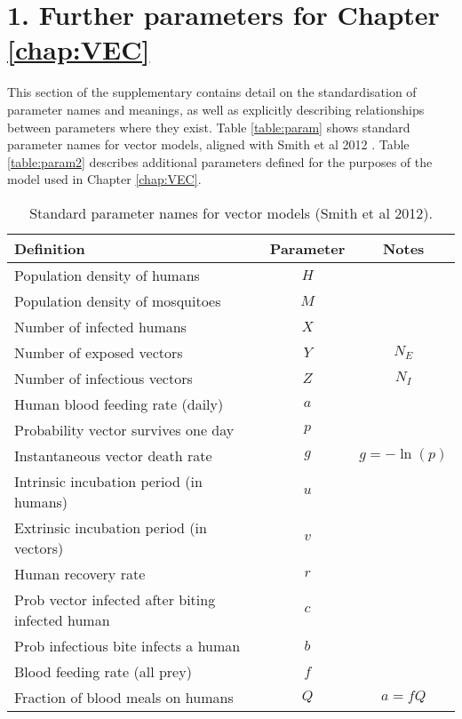 \section*{1. Further parameters for Chapter \ref{chap:VEC}}

This section of the supplementary contains detail on the standardisation of parameter names and meanings, as well as explicitly describing relationships between parameters where they exist. Table \ref{table:param} shows standard parameter names for vector models, aligned with Smith et al 2012 \cite{Smith2012}. Table \ref{table:param2} describes additional parameters defined for the purposes of the model used in Chapter \ref{chap:VEC}.

\begin{table*}[h]
\caption{Standard parameter names for vector models (Smith et al 2012).}%
\vspace{.1cm}
\centering %
\begin{tabular}{l c c}%
\hline\hline                        %
Definition & Parameter & Notes \\ [0.5ex]%
\hline                  %
Population density of humans & $H$ &  \\
Population density of mosquitoes & $M$ &  \\
Number of infected humans & $X$ &  \\
Number of exposed vectors & $Y$ & $N_E$ \\
Number of infectious vectors & $Z$ & $N_I$ \\
Human blood feeding rate (daily) & $a$ & \\
Probability vector survives one day & $p$ & \\
Instantaneous vector death rate & $g$ & $g=-\ln(p)$  \\
Intrinsic incubation period (in humans) & $u$ & \\
Extrinsic incubation period (in vectors) & $v$ & \\
Human recovery rate & $r$ & \\
Prob vector infected after biting infected human & $c$ & \\
Prob infectious bite infects a human & $b$ & \\
Blood feeding rate (all prey) & $f$ & \\
Fraction of blood meals on humans & $Q$ & $a=fQ$ \\

\end{tabular}
\end{table*}
